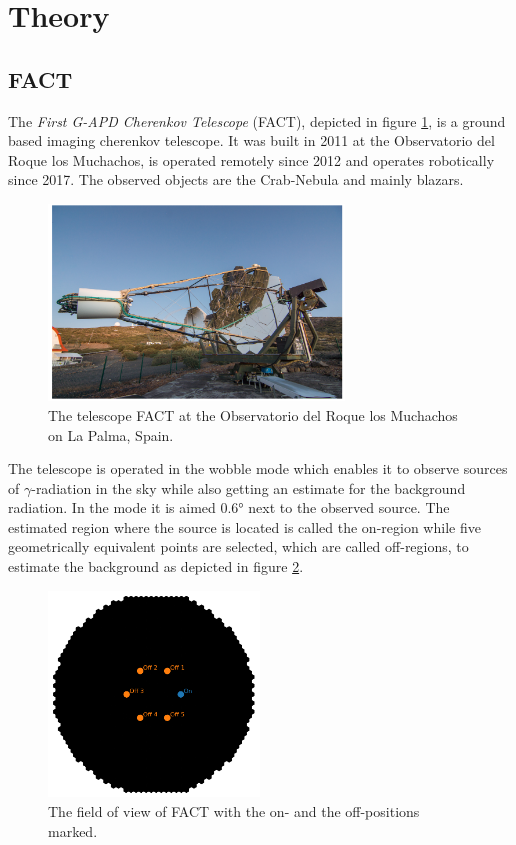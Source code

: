 \section{Theory}
\label{sec:Theorie}

\subsection{FACT}

The \textit{First G-APD Cherenkov Telescope} (FACT), depicted in figure \ref{fig:FACT}, is a ground based imaging cherenkov telescope. It was built in 2011 at the Observatorio
del Roque los Muchachos, is operated remotely since 2012 and operates robotically since 2017.
The observed objects are the Crab-Nebula and mainly blazars.
%
\begin{figure}[H]
    \centering
    \includegraphics[width=0.7\textwidth]{graphics/FACT.png}
    \caption{The telescope FACT at the Observatorio del Roque los Muchachos on La Palma, Spain. \cite{sample}}
    \label{fig:FACT}
  \end{figure}
The telescope is operated in the wobble mode which enables it to observe sources of $\gamma$-radiation in the sky while also getting an estimate for the
background radiation. In the mode it is aimed $0.6 °$ next to the observed source. The estimated region where the source is located is called the on-region
while five geometrically equivalent points are selected, which are called off-regions, to estimate the background as depicted in figure
\ref{fig:OnOff}.

\begin{figure}[H]
    \centering
    \includegraphics[width=0.5\textwidth]{graphics/OnOff.png}
    \caption{The field of view of FACT with the on- and the off-positions marked. \cite{sample}}
    \label{fig:OnOff}
\end{figure}

